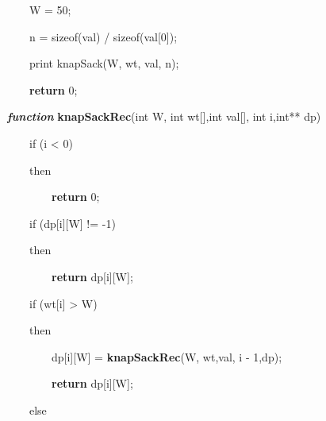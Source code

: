 \documentclass[letterpaper]{article}
\begin{document}
\begin{multicols}{2}
{\color[rgb]{0.2509804,0.25882354,0.30588236}
\ \ \ \ W = 50;}

{\color[rgb]{0.2509804,0.25882354,0.30588236}
\ \ \ \ n = sizeof(val) / sizeof(val[0]);}

{\color[rgb]{0.2509804,0.25882354,0.30588236}
\ \ \ \ print knapSack(W, wt, val, n);}

\textcolor[rgb]{0.2509804,0.25882354,0.30588236}{\ \ \ \ }\textbf{\textcolor[rgb]{0.2509804,0.25882354,0.30588236}{return}}\textcolor[rgb]{0.2509804,0.25882354,0.30588236}{
0;}


\bigskip

\textbf{\textit{\textcolor[rgb]{0.2509804,0.25882354,0.30588236}{function}}}\textcolor[rgb]{0.2509804,0.25882354,0.30588236}{
}\textbf{\textcolor[rgb]{0.2509804,0.25882354,0.30588236}{knapSackRec}}\textcolor[rgb]{0.2509804,0.25882354,0.30588236}{(int
W, int wt[],int val[], int i,int** dp)}

{\color[rgb]{0.2509804,0.25882354,0.30588236}
\ \ \ \ if (i {\textless} 0)}

{\color[rgb]{0.2509804,0.25882354,0.30588236}
\ \ \ \ then}

\textcolor[rgb]{0.2509804,0.25882354,0.30588236}{\ \ \ \ \ \ \ \ }\textbf{\textcolor[rgb]{0.2509804,0.25882354,0.30588236}{return}}\textcolor[rgb]{0.2509804,0.25882354,0.30588236}{
0;}

{\color[rgb]{0.2509804,0.25882354,0.30588236}
\ \ \ \ if (dp[i][W] != -1)}

{\color[rgb]{0.2509804,0.25882354,0.30588236}
\ \ \ \ then}

\textcolor[rgb]{0.2509804,0.25882354,0.30588236}{\ \ \ \ \ \ \ \ }\textbf{\textcolor[rgb]{0.2509804,0.25882354,0.30588236}{return}}\textcolor[rgb]{0.2509804,0.25882354,0.30588236}{
dp[i][W];}

{\color[rgb]{0.2509804,0.25882354,0.30588236}
\ \ \ \ if (wt[i] {\textgreater} W) }

{\color[rgb]{0.2509804,0.25882354,0.30588236}
\ \ \ \ then}

\textcolor[rgb]{0.2509804,0.25882354,0.30588236}{\ \ \ \ \ \ \ \ dp[i][W] =
}\textbf{\textcolor[rgb]{0.2509804,0.25882354,0.30588236}{knapSackRec}}\textcolor[rgb]{0.2509804,0.25882354,0.30588236}{(W,
wt,val, i - 1,dp);}

\textcolor[rgb]{0.2509804,0.25882354,0.30588236}{\ \ \ \ \ \ \ \ }\textbf{\textcolor[rgb]{0.2509804,0.25882354,0.30588236}{return}}\textcolor[rgb]{0.2509804,0.25882354,0.30588236}{
dp[i][W];}

{\color[rgb]{0.2509804,0.25882354,0.30588236}
\ \ \ \ else}


\end{multicols}
\end{document}
